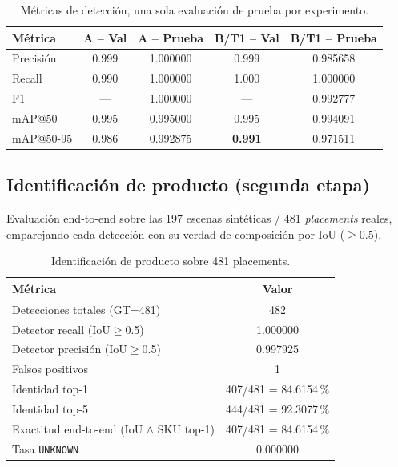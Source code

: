 \documentclass[10pt,a4paper]{article}
\begin{document}
\begin{table}[h]
  \centering
  \small
  \caption{Métricas de detección, una sola evaluación de prueba por
  experimento.}
  \label{tab:metricas}
  \begin{tabular}{lcccc}
    \toprule
    Métrica & A -- Val & A -- Prueba & B/T1 -- Val & B/T1 -- Prueba \\
    \midrule
    Precisión  & 0.999 & 1.000000 & 0.999 & 0.985658 \\
    Recall     & 0.990 & 1.000000 & 1.000 & 1.000000 \\
    F1         & ---   & 1.000000 & ---   & 0.992777 \\
    mAP@50     & 0.995 & 0.995000 & 0.995 & 0.994091 \\
    mAP@50-95  & 0.986 & 0.992875 & \textbf{0.991} & 0.971511 \\
    \bottomrule
  \end{tabular}
\end{table}

\subsection{Identificación de producto (segunda etapa)}

Evaluación end-to-end sobre las 197 escenas sintéticas / 481 \emph{placements}
reales, emparejando cada detección con su verdad de composición por IoU
($\geq 0.5$).

\begin{table}[h]
  \centering
  \caption{Identificación de producto sobre 481 placements.}
  \label{tab:identidad}
  \begin{tabular}{lc}
    \toprule
    Métrica & Valor \\
    \midrule
    Detecciones totales (GT=481) & 482 \\
    Detector recall (IoU$\geq$0.5) & 1.000000 \\
    Detector precisión (IoU$\geq$0.5) & 0.997925 \\
    Falsos positivos & 1 \\
    Identidad top-1 & 407/481 = 84.6154\,\% \\
    Identidad top-5 & 444/481 = 92.3077\,\% \\
    Exactitud end-to-end (IoU $\wedge$ SKU top-1) & 407/481 = 84.6154\,\% \\
    Tasa \texttt{UNKNOWN} & 0.000000 \\
    \bottomrule
  \end{tabular}
\end{table}
\end{document}
